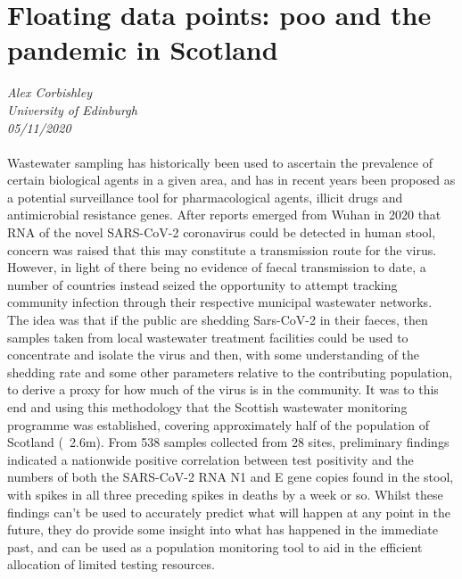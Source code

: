 \documentclass[11pt]{article}
\begin{document}
\section{Floating data points: poo and the pandemic in Scotland}
\textit{Alex Corbishley\\University of Edinburgh\\05/11/2020}
\\
\\Wastewater sampling has historically been used to ascertain the prevalence of certain biological agents in a given area, and has in recent years been proposed as a potential surveillance tool for pharmacological agents, illicit drugs and antimicrobial resistance genes. After reports emerged from Wuhan in 2020 that RNA of the novel SARS-CoV-2 coronavirus could be detected in human stool, concern was raised that this may constitute a  transmission route for the virus. However, in light of there being no evidence of faecal transmission to date, a number of countries instead seized the opportunity to attempt tracking community infection through their respective municipal wastewater networks. The idea was that if the public are shedding Sars-CoV-2 in their faeces, then samples taken from local wastewater treatment facilities could be used to concentrate and isolate the virus and then, with some understanding of the shedding rate and some other parameters relative to the contributing population, to derive a proxy for how much of the virus is in the community. It was to this end and using this methodology that the Scottish wastewater monitoring programme was established, covering approximately half of the population of Scotland (~2.6m). From 538 samples collected from 28 sites, preliminary findings indicated a nationwide positive correlation between test positivity and the numbers of both the SARS-CoV-2 RNA N1 and E gene copies found in the stool, with spikes in all three preceding spikes in deaths by a week or so. Whilst these findings can't be used to accurately predict what will happen at any point in the future, they do provide some insight into what has happened in the immediate past, and can be used as a population monitoring tool to aid in the efficient allocation of limited testing resources.
\end{document}
